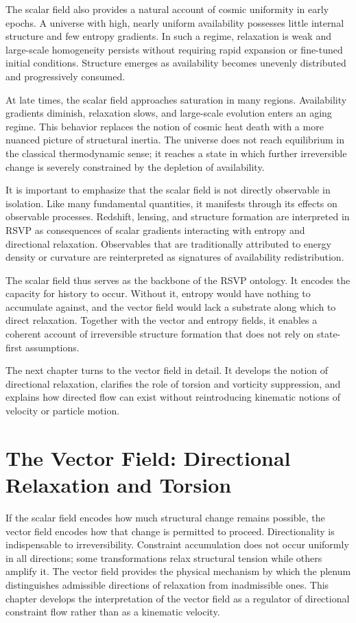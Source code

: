 \documentclass[11pt,oneside]{book}
\begin{document}
The scalar field also provides a natural account of cosmic uniformity in early epochs. A universe with high, nearly uniform availability possesses little internal structure and few entropy gradients. In such a regime, relaxation is weak and large-scale homogeneity persists without requiring rapid expansion or fine-tuned initial conditions. Structure emerges as availability becomes unevenly distributed and progressively consumed.

At late times, the scalar field approaches saturation in many regions. Availability gradients diminish, relaxation slows, and large-scale evolution enters an aging regime. This behavior replaces the notion of cosmic heat death with a more nuanced picture of structural inertia. The universe does not reach equilibrium in the classical thermodynamic sense; it reaches a state in which further irreversible change is severely constrained by the depletion of availability.

It is important to emphasize that the scalar field is not directly observable in isolation. Like many fundamental quantities, it manifests through its effects on observable processes. Redshift, lensing, and structure formation are interpreted in RSVP as consequences of scalar gradients interacting with entropy and directional relaxation. Observables that are traditionally attributed to energy density or curvature are reinterpreted as signatures of availability redistribution.

The scalar field thus serves as the backbone of the RSVP ontology. It encodes the capacity for history to occur. Without it, entropy would have nothing to accumulate against, and the vector field would lack a substrate along which to direct relaxation. Together with the vector and entropy fields, it enables a coherent account of irreversible structure formation that does not rely on state-first assumptions.

The next chapter turns to the vector field in detail. It develops the notion of directional relaxation, clarifies the role of torsion and vorticity suppression, and explains how directed flow can exist without reintroducing kinematic notions of velocity or particle motion.

\chapter{The Vector Field: Directional Relaxation and Torsion}

If the scalar field encodes how much structural change remains possible, the vector field encodes how that change is permitted to proceed. Directionality is indispensable to irreversibility. Constraint accumulation does not occur uniformly in all directions; some transformations relax structural tension while others amplify it. The vector field provides the physical mechanism by which the plenum distinguishes admissible directions of relaxation from inadmissible ones. This chapter develops the interpretation of the vector field as a regulator of directional constraint flow rather than as a kinematic velocity.
\end{document}
